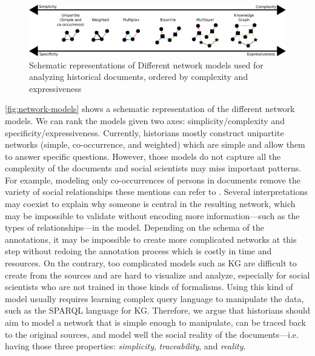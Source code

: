 \begin{figure}
    \centering %
    \includegraphics[width=\columnwidth]{static/figures/HSNAProcess/OriginalPaperFigures/models.pdf}
    \caption{Schematic representations of Different network models used for analyzing historical documents, ordered by complexity and expressiveness}
    \label{fig:network-models}
\end{figure}

\autoref{fig:network-models} shows a schematic representation of the different network models.
We can rank the models given two axes: simplicity/complexity and specificity/expressiveness.
Currently, historians mostly construct unipartite networks (simple, co-occurrence, and weighted) which are simple and allow them to answer specific questions.
However, those models do not capture all the complexity of the documents and social scientists may miss important patterns.
For example, modeling only co-occurrences of persons in documents remove the variety of social relationships these mentions can refer to \cite{lemercier12FormalNetwork2015}.
Several interpretations may coexist to explain why someone is central in the resulting network, which may be impossible to validate without encoding more information---such as the types of relationships---in the model.
Depending on the schema of the annotations, it may be impossible to create more complicated networks at this step without redoing the annotation process which is costly in time and resources.
On the contrary, too complicated models such as KG are difficult to create from the sources and are hard to visualize and analyze, especially for social scientists who are not trained in those kinds of formalisms.
Using this kind of model usually requires learning complex query language to manipulate the data, such as the SPARQL language for KG\@.
Therefore, we argue that historians should aim to model a network that is simple enough to manipulate, can be traced back to the original sources, and model well the social reality of the documents---i.e. having those three properties: \textit{simplicity}, \textit{traceability}, and \textit{reality}.

